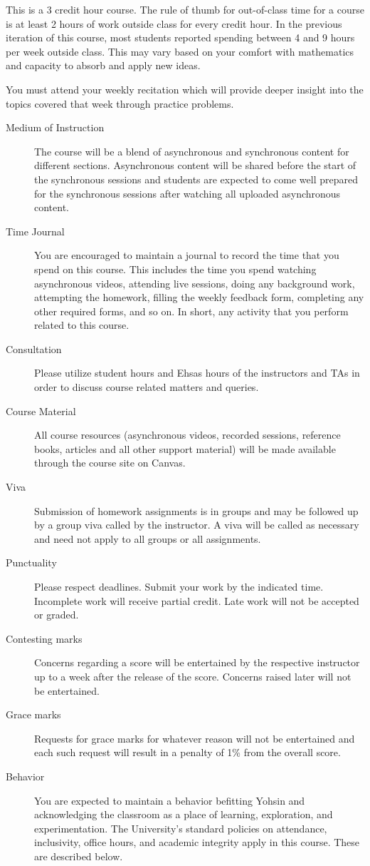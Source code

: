 \documentclass[a4paper]{article}
\begin{document}
This is a 3 credit hour course. The rule of thumb for out-of-class time for a course is at least 2 hours of work outside class for every credit hour. In the previous iteration of this course, most students reported spending between 4 and 9 hours per week outside class. This may vary based on your comfort with mathematics and capacity to absorb and apply new ideas.

You must attend your weekly recitation which will provide deeper insight into the topics covered that week through practice problems.

\begin{description}
\item[Medium of Instruction] The course will be a blend of asynchronous and synchronous content for different sections. Asynchronous content will be shared before the start of the synchronous sessions and students are expected to come well prepared for the synchronous sessions after watching all uploaded asynchronous content.
\item[Time Journal] You are encouraged to maintain a journal to record the time that you spend on this course. This includes the time you spend watching asynchronous videos, attending live sessions, doing any background work, attempting the homework, filling the weekly feedback form, completing any other required forms, and so on. In short, any activity that you perform related to this course. 
\item[Consultation] Please utilize student hours and Ehsas hours of the instructors and TAs in order to discuss course related matters and queries.
\item[Course Material] All course resources (asynchronous videos, recorded sessions, reference books, articles and all other support material) will be made available through the course site on Canvas.
\item[Viva] Submission of homework assignments is in groups and may be followed up by a group viva called by the instructor. A viva will be called as necessary and need not apply to all groups or all assignments.
\item[Punctuality] Please respect deadlines. Submit your work by the indicated time. Incomplete work will receive partial credit. Late work will not be accepted or graded. 
\item[Contesting marks] Concerns regarding a score will be entertained by the respective instructor up to a week after the release of the score. Concerns raised later will not be entertained. 
\item[Grace marks] Requests for grace marks for whatever reason will not be entertained and each such request will result in a penalty of 1\% from the overall score. 
\item[Behavior] You are expected to maintain a behavior befitting Yohsin and acknowledging the classroom as a place of learning, exploration, and experimentation. The University’s standard policies on attendance, inclusivity, office hours, and academic integrity apply in this course. These are described below. 
\end{description}
\end{document}
